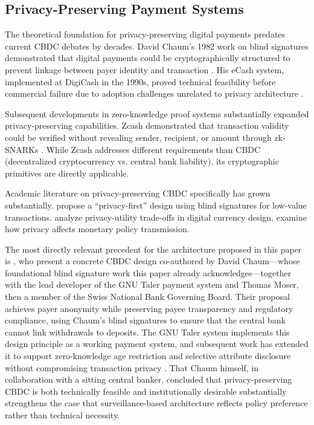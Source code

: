 \documentclass[11pt]{article}
\begin{document}
\subsection{Privacy-Preserving Payment Systems}

The theoretical foundation for privacy-preserving digital payments predates current CBDC debates by decades. David Chaum's 1982 work on blind signatures demonstrated that digital payments could be cryptographically structured to prevent linkage between payer identity and transaction \citep{Chaum1982}. His eCash system, implemented at DigiCash in the 1990s, proved technical feasibility before commercial failure due to adoption challenges unrelated to privacy architecture \citep{Chaum1983}.

Subsequent developments in zero-knowledge proof systems substantially expanded privacy-preserving capabilities. Zcash demonstrated that transaction validity could be verified without revealing sender, recipient, or amount through zk-SNARKs \citep{Sasson2014}. While Zcash addresses different requirements than CBDC (decentralized cryptocurrency vs. central bank liability), its cryptographic primitives are directly applicable.

Academic literature on privacy-preserving CBDC specifically has grown substantially. \citet{Gross2021} propose a ``privacy-first'' design using blind signatures for low-value transactions. \citet{Allen2020} analyze privacy-utility trade-offs in digital currency design. \citet{Garratt2021} examine how privacy affects monetary policy transmission.

The most directly relevant precedent for the architecture proposed in this paper is \citet{ChaumGrothoffMoser2021}, who present a concrete CBDC design co-authored by David Chaum---whose foundational blind signature work this paper already acknowledges---together with the lead developer of the GNU Taler payment system and Thomas Moser, then a member of the Swiss National Bank Governing Board. Their proposal achieves payer anonymity while preserving payee transparency and regulatory compliance, using Chaum's blind signatures to ensure that the central bank cannot link withdrawals to deposits. The GNU Taler system \citep{Burdges2016Taler} implements this design principle as a working payment system, and subsequent work has extended it to support zero-knowledge age restriction and selective attribute disclosure without compromising transaction privacy \citep{Kesim2022Taler}. That Chaum himself, in collaboration with a sitting central banker, concluded that privacy-preserving CBDC is both technically feasible and institutionally desirable substantially strengthens the case that surveillance-based architecture reflects policy preference rather than technical necessity.
\end{document}
